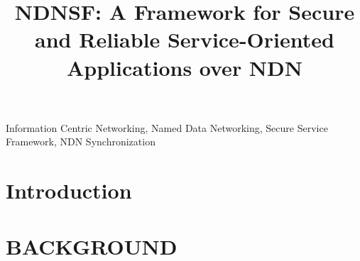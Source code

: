 \documentclass[10pt, conference, letterpaper]{IEEEtran}
\begin{document}
%
\title{NDNSF: A Framework for Secure and Reliable Service-Oriented Applications over NDN}
%
%
%


\maketitle

\pagestyle{plain}

\begin{abstract}
 

\end{abstract}

\begin{IEEEkeywords}
Information Centric Networking, Named Data Networking, Secure Service Framework, NDN Synchronization
\end{IEEEkeywords}

\section{Introduction}
 

\section{BACKGROUND}
\label{sec:background}
 
\end{document}
